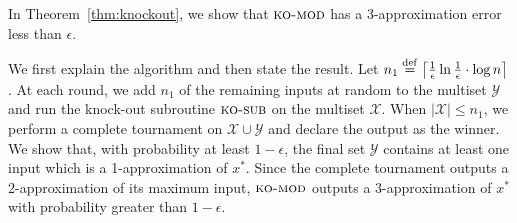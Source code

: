 \documentclass[twoside,11pt]{article}
\newcommand{\df}[1][\rm{def}]{\stackrel{#1}{=}}
\newcommand{\cY}{\mathcal{Y}}
\newcommand{\cX}{\mathcal{X}}
\newcommand{\algorithms}[1]{\textsc{#1}}
\newcommand{\algkosub}{\algorithms{ko-sub}}
\newcommand{\algkomod}{\algorithms{ko-mod}}
\newcommand{\maxx}{x^*}
\newcommand{\errorcomb}{\epsilon}
\begin{document}
In Theorem~\ref{thm:knockout}, we show that $\algkomod$ has a $3$-approximation error less than $\errorcomb$. 

We first explain the algorithm and then state the result. Let $n_1\df
\left\lceil\frac1\errorcomb\ln \frac1\errorcomb \cdot\log n
\right\rceil$. At each round, we add $n_1$ of the remaining inputs at
random to the multiset $\cY$ and run the knock-out subroutine
$\algkosub$ on the multiset $\cX$. When $|\cX| \le n_1$, we perform a
complete tournament on $\cX\cup\cY$ and declare the output as the
winner. We show that, with probability at least $1-\errorcomb$, the
final set $\cY$ contains at least one input which is a 1-approximation
of $\maxx$.  Since the complete tournament outputs a $2$-approximation
of its maximum input, $\algkomod$ outputs a $3$-approximation of
$\maxx$ with probability greater than $1-\errorcomb$.
\end{document}
